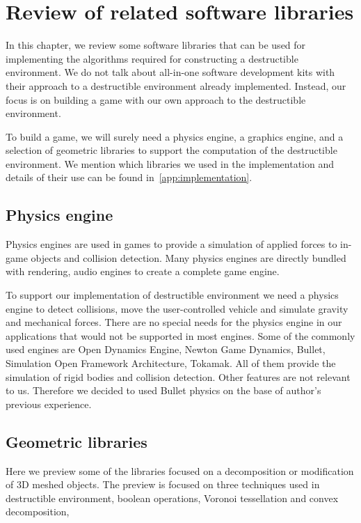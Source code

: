 \chapter{Review of related software libraries}
\label{chapt:technology}
In this chapter, we review some software libraries that can be used for implementing the algorithms required for constructing a destructible environment. We do not talk about all-in-one software development kits with their approach to a destructible environment already implemented. Instead, our focus is on building a game with our own approach to the destructible environment. 

To build a game, we will surely need a physics engine, a graphics engine, and a selection of geometric libraries to support the computation of the destructible environment. We mention which libraries we used in the implementation and details of their use can be found in~\cref{app:implementation}.

\section{Physics engine}
Physics engines are used in games to provide a simulation of applied forces to in-game objects and collision detection. Many physics engines are directly bundled with rendering, audio engines to create a complete game engine. 

To support our implementation of destructible environment we need a physics engine to detect collisions, move the user-controlled vehicle and simulate gravity and mechanical forces. There are no special needs for the physics engine in our applications that would not be supported in most engines. Some of the commonly used engines are Open Dynamics Engine, Newton Game Dynamics, Bullet, Simulation Open Framework Architecture, Tokamak. All of them provide the simulation of rigid bodies and collision detection. Other features are not relevant to us. Therefore we decided to used Bullet physics on the base of author's previous experience.

\section{Geometric libraries}
Here we preview some of the libraries focused on a decomposition or modification of 3D meshed objects. The preview is focused on three techniques used in destructible environment, boolean operations, Voronoi tessellation and convex decomposition,


